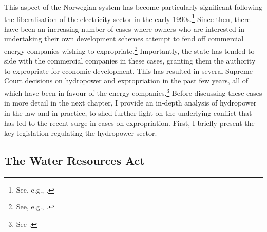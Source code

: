 This aspect of the Norwegian system has become particularly significant following the liberalisation of the electricity sector in the early 1990s.\footnote{See, e.g., \cite{larsen06}.} Since then, there have been an increasing number of cases where owners who are interested in undertaking their own development schemes attempt to fend off commercial energy companies wishing to expropriate.\footnote{See, e.g., \cite{sofienlund07}.} Importantly, the state has tended to side with the commercial companies in these cases, granting them the authority to expropriate for economic development. This has resulted in several Supreme Court decisions on hydropower and expropriation in the past few years, all of which have been in favour of the energy companies.\footnote{See  \cite{uleberg08,jorpeland11,klovtveit11,otra13}.} Before discussing these cases in more detail in the next chapter, I provide an in-depth analysis of hydropower in the law and in practice, to shed further light on the underlying conflict that has led to the recent surge in cases on expropriation. First, I briefly present the key legislation regulating the hydropower sector.

\subsection{The Water Resources Act}\label{sec:wra00}

